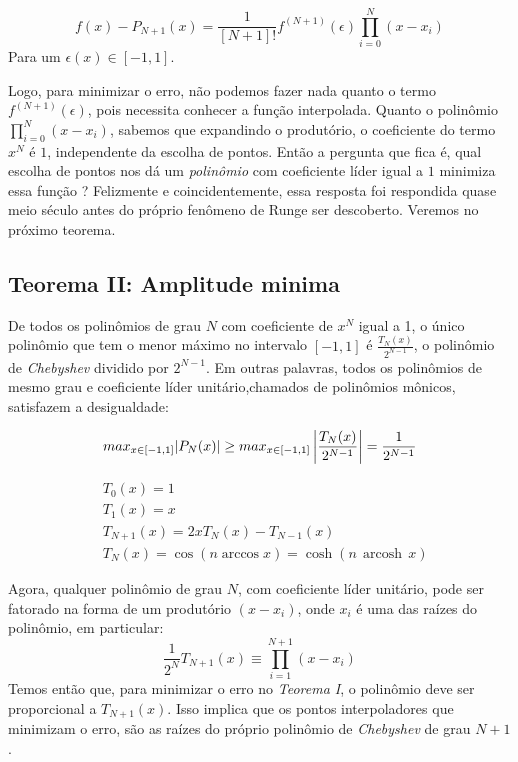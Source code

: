  \begin{equation}
 f(x) - P_{N+1}(x) = \frac{1}{[N+1]!}f^{(N+1)}(\epsilon)\prod^{N}_{i = 0} (x - x_i)
 \end{equation}
 Para um $\epsilon(x) \in [-1,1]$.
 
 Logo, para minimizar o erro, não podemos fazer nada quanto o termo $f^{(N+1)}(\epsilon)$, pois necessita conhecer a função interpolada. Quanto o polinômio $\prod^{N}_{i = 0} (x - x_i)$, sabemos que expandindo o produtório, o coeficiente do termo $x^N$ é $1$, independente da escolha de pontos. Então a pergunta que fica é, qual escolha de pontos nos dá um \emph{polinômio} com coeficiente líder igual a $1$ minimiza essa função ? Felizmente e coincidentemente, essa resposta foi respondida quase meio século antes do próprio fenômeno de Runge ser descoberto. Veremos no próximo teorema.

 
\subsection{Teorema II: Amplitude minima}
 De todos os polinômios de grau $N$ com coeficiente de $x^N$ igual a 1, o único polinômio que tem o menor máximo no intervalo $[-1,1]$ é $\frac{T_N(x)}{2^{N-1}}$, o polinômio de \emph{Chebyshev}  dividido por $2^{N-1}$. Em outras palavras, todos os polinômios de mesmo grau e coeficiente líder unitário,chamados de polinômios mônicos, satisfazem a desigualdade:

\begin{equation}
	max_{x \in [-1,1]}|P_N(x)| \geq  max_{x \in [-1,1]} \left |\frac{T_N(x)}{2^{N-1}}  \right |  = \frac{1}{2^{N-1}}\\
\end{equation}

\begin{align}
    &T_0(x) = 1\\
    &T_1(x) = x\\
    &T_{N+1}(x) = 2xT_N(x) - T_{N-1}(x)\\
    &T_{N}(x) =\cos(n \arccos x)=\cosh(n\,\operatorname{arcosh}\,x)
\end{align}

 Agora, qualquer polinômio de grau $N$, com coeficiente líder unitário, pode ser fatorado na forma de um produtório  $(x - x_i)$, onde $x_i$ é uma das raízes do polinômio, em particular: 
 \begin{equation}
 \frac{1}{2^N}T_{N+1}(x) \equiv \prod_{i = 1}^{N+1} (x-x_i)
 \end{equation}
 Temos então que, para minimizar o erro no \emph{Teorema I}, o polinômio deve ser proporcional a $T_{N+1}(x)$. Isso implica que  os pontos interpoladores que minimizam o erro, são as raízes do próprio polinômio de \emph{Chebyshev} de grau $N+1$.
 
